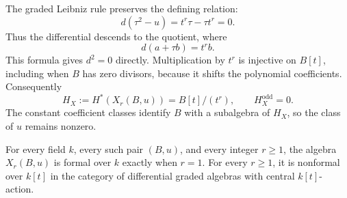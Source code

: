 The graded Leibniz rule preserves the defining relation:
\[
 d(\tau^2-u)=t^r\tau-\tau t^r=0.
\]
Thus the differential descends to the quotient, where
\[
 d(a+\tau b)=t^r b.
\]
This formula gives $d^2=0$ directly.
Multiplication by $t^r$ is injective on $B[t]$, including when $B$
has zero divisors, because it shifts the polynomial coefficients.
Consequently
\[
 H_X:=H^*(X_r(B,u))=B[t]/(t^r),\qquad H_X^{\mathrm{odd}}=0.
\]
The constant coefficient classes identify $B$ with a subalgebra of $H_X$,
so the class of $u$ remains nonzero.

\begin{theorem}\label{thm:ha-common-model-formality}
For every field $k$, every such pair $(B,u)$, and every integer
$r\geq1$, the algebra $X_r(B,u)$ is formal over $k$ exactly when $r=1$.
For every $r\geq1$, it is nonformal over $k[t]$ in the category
of differential graded algebras with central $k[t]$-action.
\end{theorem}

